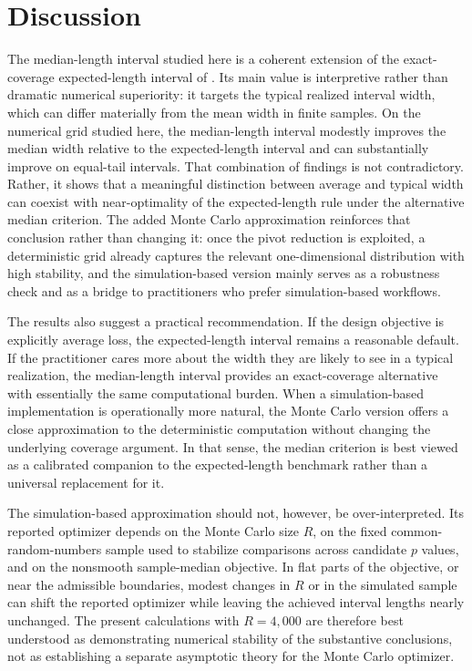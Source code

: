 \documentclass[11pt]{article}
\begin{document}
\section{Discussion}
The median-length interval studied here is a coherent extension of the exact-coverage expected-length interval of \citet{chakraborti2012shortest}. Its main value is interpretive rather than dramatic numerical superiority: it targets the typical realized interval width, which can differ materially from the mean width in finite samples. On the numerical grid studied here, the median-length interval modestly improves the median width relative to the expected-length interval and can substantially improve on equal-tail intervals. That combination of findings is not contradictory. Rather, it shows that a meaningful distinction between average and typical width can coexist with near-optimality of the expected-length rule under the alternative median criterion. The added Monte Carlo approximation reinforces that conclusion rather than changing it: once the pivot reduction is exploited, a deterministic grid already captures the relevant one-dimensional distribution with high stability, and the simulation-based version mainly serves as a robustness check and as a bridge to practitioners who prefer simulation-based workflows.

The results also suggest a practical recommendation. If the design objective is explicitly average loss, the expected-length interval remains a reasonable default. If the practitioner cares more about the width they are likely to see in a typical realization, the median-length interval provides an exact-coverage alternative with essentially the same computational burden. When a simulation-based implementation is operationally more natural, the Monte Carlo version offers a close approximation to the deterministic computation without changing the underlying coverage argument. In that sense, the median criterion is best viewed as a calibrated companion to the expected-length benchmark rather than a universal replacement for it.

The simulation-based approximation should not, however, be over-interpreted. Its reported optimizer depends on the Monte Carlo size $R$, on the fixed common-random-numbers sample used to stabilize comparisons across candidate $p$ values, and on the nonsmooth sample-median objective. In flat parts of the objective, or near the admissible boundaries, modest changes in $R$ or in the simulated sample can shift the reported optimizer while leaving the achieved interval lengths nearly unchanged. The present calculations with $R=4{,}000$ are therefore best understood as demonstrating numerical stability of the substantive conclusions, not as establishing a separate asymptotic theory for the Monte Carlo optimizer.
\end{document}
